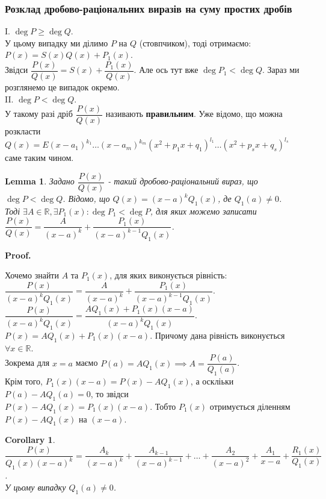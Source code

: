 \documentclass[a4paper, 10pt]{extarticle}
\makeatletter
\def\qed{$\blacksquare$}
\def\qed{$\blacksquare$}
\theoremstyle{theoremdd}
\theoremstyle{theoremdd}
\theoremstyle{theoremdd}
\theoremstyle{theoremdd}
\theoremstyle{theoremdd}
\theoremstyle{theoremdd}
\theoremstyle{theoremdd}
\newtheorem{lemma}[theorem]{Lemma}
\theoremstyle{theoremdd}
\newtheorem{corollary}[theorem]{Corollary}
\renewenvironment{proof}[1][Proof.\\]{\par
\pushQED{\hfill \qed}%
\normalfont \topsep6\p@\@plus6\p@\relax
\trivlist
\item\relax
{\bfseries
#1\@addpunct{.}}\hspace\labelsep\ignorespaces
}{%
\popQED\endtrivlist\@endpefalse
}
\makeatother
\begin{document}
\subsubsection*{Розклад дробово-раціональних виразів на суму простих дробів}
I. $\deg P \geq \deg Q$.\\
У цьому випадку ми ділимо $P$ на $Q$ (стовпчиком), тоді отримаємо:\\
$P(x) = S(x)Q(x) + P_1(x)$.\\
Звідси $\dfrac{P(x)}{Q(x)} = S(x) + \dfrac{P_1(x)}{Q(x)}$. Але ось тут вже $\deg P_1  < \deg Q$. Зараз ми розглянемо це випадок окремо.
\bigskip \\
II. $\deg P < \deg Q$.\\
У такому разі дріб $\dfrac{P(x)}{Q(x)}$ називають \textbf{правильним}.
Уже відомо, що можна розкласти $Q(x) = E(x-a_1)^{k_1} \dots (x-a_m)^{k_m} (x^2+p_1x+q_1)^{l_1} \dots (x^2+p_s x+q_s)^{l_s}$ саме таким чином.

\begin{lemma}
Задано $\dfrac{P(x)}{Q(x)}$ - такий дробово-раціональний вираз, що $\deg P < \deg Q$. Відомо, що $Q(x) = (x-a)^k Q_1(x)$, де $Q_1(a) \neq 0$.\\
Тоді $\exists A \in \mathbb{R}, \exists P_1(x): \deg P_1 < \deg P$, для яких можемо записати\\
$\dfrac{P(x)}{Q(x)} = \dfrac{A}{(x-a)^k} + \dfrac{P_1(x)}{(x-a)^{k-1}Q_1(x)}$.
\end{lemma}

\begin{proof}
Хочемо знайти $A$ та $P_1(x)$, для яких виконується рівність:\\
$\dfrac{P(x)}{(x-a)^kQ_1(x)} = \dfrac{A}{(x-a)^k} + \dfrac{P_1(x)}{(x-a)^{k-1}Q_1(x)}$.\\
$\dfrac{P(x)}{(x-a)^k Q_1(x)} = \dfrac{AQ_1(x)+P_1(x)(x-a)}{(x-a)^kQ_1(x)}$.\\
$P(x) = AQ_1(x) + P_1(x)(x-a)$. Причому дана рівність виконується $\forall x \in \mathbb{R}$.\\
Зокрема для $x=a$ маємо $P(a) = AQ_1(x) \implies A = \dfrac{P(a)}{Q_1(a)}$.\\
Крім того, $P_1(x)(x-a) = P(x) - AQ_1(x)$, а оскліьки $P(a) - AQ_1(a) = 0$, то звідси \\
$P(x) -AQ_1(x) = P_1(x)(x-a)$. Тобто $P_1(x)$ отримується діленням $P(x)-AQ_1(x)$ на $(x-a)$.
\end{proof}

\begin{corollary}
$\dfrac{P(x)}{Q_1(x)(x-a)^k} = \dfrac{A_k}{(x-a)^k} + \dfrac{A_{k-1}}{(x-a)^{k-1}} + \dots + \dfrac{A_2}{(x-a)^2} + \dfrac{A_1}{x-a} + \dfrac{R_1(x)}{Q_1(x)}$.\\
У цьому випадку $Q_1(a) \neq 0$.
\end{corollary}
\end{document}
